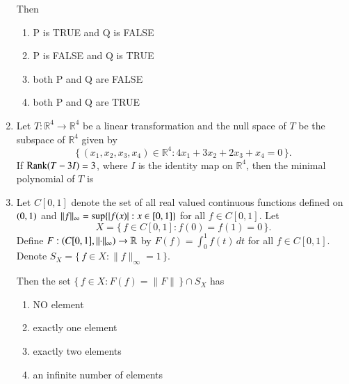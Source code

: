 \documentclass[journal,12pt,onecolumn]{IEEEtran}
\theoremstyle{remark}
\begin{document}
\begin{enumerate}[start=1, label=Q.\arabic*]
Then
\begin{enumerate}
\item P is TRUE and Q is FALSE
\item P is FALSE and Q is TRUE
\item both P and Q are FALSE
\item both P and Q are TRUE
\end{enumerate}

\hfill{}

\item Let $T : \mathbb{R}^{4}\to \mathbb{R}^{4}$ be a linear transformation and the null space of $T$ be the subspace of $\mathbb{R}^{4}$ given by
\[
\{\, (x_{1},x_{2},x_{3},x_{4})\in \mathbb{R}^{4} : 4x_{1}+3x_{2}+2x_{3}+x_{4}=0 \,\}.
\]
If $\operatorname{Rank}\!\left(T-3I\right)=3$, where $I$ is the identity map on $\mathbb{R}^{4}$, then the minimal polynomial of $T$ is
\begin{enumerate}
\end{enumerate}

\hfill{}


\item Let $C[0,1]$ denote the set of all real valued continuous functions defined on $\left(0,1\right)$ and $\lVert f\rVert_{\infty}=\sup\{\left\vert f(x)\right\vert : x\in [0,1]\}$ for all $f\in C[0,1]$.  
Let
\[
X=\{\, f\in C[0,1] : f(0)=f(1)=0 \,\}.
\]
Define $F : \left(C[0,1],\lVert \cdot \rVert_{\infty}\right)\to \mathbb{R}$ by $F(f)=\int_{0}^{1} f(t)\,dt$ for all $f\in C[0,1]$.  
Denote $S_{X}=\{\, f\in X : \lVert f\rVert_{\infty}=1 \,\}$.  

Then the set $\{\, f\in X : F(f)=\lVert F\rVert \,\}\cap S_{X}$ has
\begin{enumerate}
\item NO element
\item exactly one element
\item exactly two elements
\item an infinite number of elements
\end{enumerate}

\hfill{}


\end{enumerate}
\end{document}
